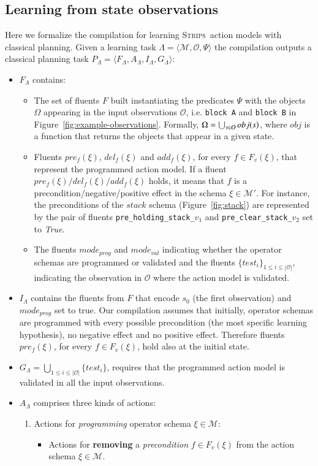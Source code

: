 \documentclass[3p,times]{elsarticle}
\newcommand{\strips}{\textsc{Strips}}     %
\newcommand{\tup}[1]{{\langle #1 \rangle}}
\begin{document}
\subsection{Learning from state observations}
Here we formalize the compilation for learning \strips\ action models with classical planning. Given a learning task $\Lambda=\tup{\mathcal{M},\mathcal{O},\Psi}$ the compilation outputs a classical planning task $P_{\Lambda}=\tup{F_{\Lambda},A_{\Lambda},I_{\Lambda},G_{\Lambda}}$:
\begin{itemize}
\item $F_{\Lambda}$ contains:
\begin{itemize}
\item The set of fluents $F$ built instantiating the predicates $\Psi$ with the objects $\Omega$ appearing in the input observations $\mathcal{O}$, i.e. {\tt\small block A} and {\tt\small block B} in Figure~\ref{fig:example-observations}. Formally, $\Omega=\bigcup_{\small s\in\mathcal{O}} obj(s)$, where $obj$ is a function that returns the objects that appear in a given state.
\item Fluents $pre_f(\xi)$, $del_f(\xi)$ and $add_f(\xi)$, for every $f\in F_v(\xi)$, that represent the programmed action model. If a fluent $pre_f(\xi)/del_f(\xi)/add_f(\xi)$ holds, it means that $f$ is a precondition/negative/positive effect in the schema $\xi\in \mathcal{M}'$. For instance, the preconditions of the $stack$ schema (Figure~\ref{fig:stack}) are represented by the pair of fluents {\small\tt pre\_holding\_stack\_$v_1$} and {\small\tt pre\_clear\_stack\_$v_2$} set to {\em True}.
\item The fluents $mode_{prog}$ and $mode_{val}$ indicating whether the operator schemas are programmed or validated and the fluents $\{test_i\}_{1\leq i\leq |\mathcal{O}|}$, indicating the observation in $\mathcal{O}$ where the action model is validated.
\end{itemize}
\item $I_{\Lambda}$ contains the fluents from $F$ that encode $s_0$ (the first observation) and $mode_{prog}$ set to true. Our compilation assumes that initially, operator schemas are programmed with every possible precondition (the most specific learning hypothesis), no negative effect and no positive effect. Therefore fluents $pre_f(\xi)$, for every $f\in F_v(\xi)$, hold also at the initial state. 

\item $G_{\Lambda}=\bigcup_{1\leq i\leq |\mathcal{O}|}\{test_i\}$, requires that the programmed action model is validated in all the input observations.
\item $A_{\Lambda}$ comprises three kinds of actions:
\begin{enumerate}
\item Actions for {\em programming} operator schema $\xi\in\mathcal{M}$:
\begin{itemize}
\item Actions for {\bf removing} a {\em precondition} $f\in F_v(\xi)$ from the action schema $\xi\in\mathcal{M}$.


\end{itemize}
\end{enumerate}
\end{itemize}
\end{document}
